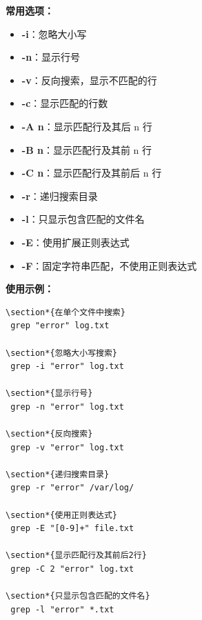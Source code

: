 \documentclass[12pt,UTF8]{ctexbook}
\begin{document}
\textbf{常用选项：}
\begin{itemize}
    \item \textbf{-i}：忽略大小写
    \item \textbf{-n}：显示行号
    \item \textbf{-v}：反向搜索，显示不匹配的行
    \item \textbf{-c}：显示匹配的行数
    \item \textbf{-A n}：显示匹配行及其后 n 行
    \item \textbf{-B n}：显示匹配行及其前 n 行
    \item \textbf{-C n}：显示匹配行及其前后 n 行
    \item \textbf{-r}：递归搜索目录
    \item \textbf{-l}：只显示包含匹配的文件名
    \item \textbf{-E}：使用扩展正则表达式
    \item \textbf{-F}：固定字符串匹配，不使用正则表达式
\end{itemize}

\textbf{使用示例：}
\begin{verbatim}
\section*{在单个文件中搜索}
 grep "error" log.txt

\section*{忽略大小写搜索}
 grep -i "error" log.txt

\section*{显示行号}
 grep -n "error" log.txt

\section*{反向搜索}
 grep -v "error" log.txt

\section*{递归搜索目录}
 grep -r "error" /var/log/

\section*{使用正则表达式}
 grep -E "[0-9]+" file.txt

\section*{显示匹配行及其前后2行}
 grep -C 2 "error" log.txt

\section*{只显示包含匹配的文件名}
 grep -l "error" *.txt
\end{verbatim}
\end{document}
